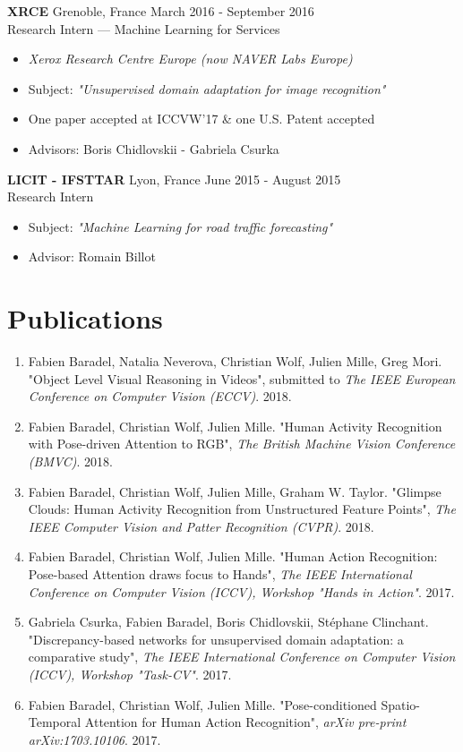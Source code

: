 \documentclass[10pt]{res} %
\begin{document}
\begin{resume}
\textbf{XRCE} \hfill Grenoble, France \hfill March 2016 - September 2016 \\
Research Intern --- Machine Learning for Services
\begin{itemize}
\item \textit{Xerox Research Centre Europe (now NAVER Labs Europe)}
\item Subject: \textit{"Unsupervised domain adaptation for image recognition"}
\item One paper accepted at ICCVW'17 \& one U.S. Patent accepted
\item Advisors: Boris Chidlovskii - Gabriela Csurka
\end{itemize}

\textbf{LICIT - IFSTTAR} \hfill Lyon, France \hfill June 2015 - August 2015 \\
Research Intern
\begin{itemize}
\item Subject: \textit{"Machine Learning for road traffic forecasting"}
\item Advisor: Romain Billot
\end{itemize}



\section{\large Publications} 
\begin{enumerate}[wide=0pt]
	\item Fabien Baradel, Natalia Neverova, Christian Wolf, Julien Mille, Greg Mori. "Object Level Visual Reasoning in Videos", submitted to \textit{The IEEE European Conference on Computer Vision (ECCV)}. 2018.
	\item Fabien Baradel, Christian Wolf, Julien Mille. "Human Activity Recognition with Pose-driven Attention to RGB", \textit{The British Machine Vision Conference (BMVC)}. 2018.
	\item Fabien Baradel, Christian Wolf, Julien Mille, Graham W. Taylor. "Glimpse Clouds: Human Activity Recognition from Unstructured Feature Points", \textit{The IEEE Computer Vision and Patter Recognition (CVPR)}. 2018.
	\item Fabien Baradel, Christian Wolf, Julien Mille. "Human Action Recognition: Pose-based Attention draws focus to Hands", \textit{The IEEE International Conference on Computer Vision (ICCV), Workshop "Hands in Action"}. 2017.
	\item Gabriela Csurka, Fabien Baradel, Boris Chidlovskii, Stéphane Clinchant. "Discrepancy-based networks for unsupervised domain adaptation: a comparative study",  \textit{The IEEE International Conference on Computer Vision (ICCV), Workshop "Task-CV"}. 2017.
	\item Fabien Baradel, Christian Wolf, Julien Mille. "Pose-conditioned Spatio-Temporal Attention for Human Action Recognition",  \textit{arXiv pre-print arXiv:1703.10106}. 2017.
\end{enumerate}


\end{resume}
\end{document}
